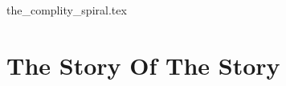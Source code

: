 {the_complity_spiral.tex}
%
%
%
%

%
%
%
%
%
%
%
%
%



%
%
%
%
%
%
%
%
%
%
%
%

\part{The Story Of The Story}

